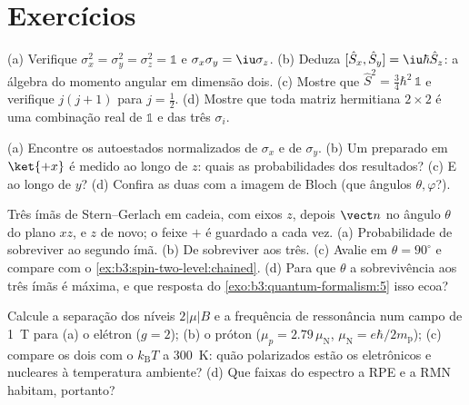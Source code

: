 \section{Exercícios}

\begin{exercise}[$\star$]\label{exo:b3:spin-two-level:1}
(a) Verifique $\sigma_x^2 = \sigma_y^2 = \sigma_z^2 = \mathbb 1$ e
$\sigma_x\sigma_y = \iu\sigma_z$. (b) Deduza $[\hat S_x, \hat S_y]
= \iu\hbar\hat S_z$: a álgebra do momento angular em dimensão dois.
(c) Mostre que $\hat S^2 = \tfrac34\hbar^2\,\mathbb 1$ e verifique
$j(j+1)$ para $j = \tfrac12$. (d) Mostre que toda matriz hermitiana
$2\times2$ é uma combinação real de $\mathbb 1$ e das três
$\sigma_i$.
\end{exercise}

\begin{exercise}[$\star$]\label{exo:b3:spin-two-level:2}
(a) Encontre os autoestados normalizados de $\sigma_x$ e de $\sigma_y$.
(b) Um  preparado em $\ket{+x}$ é medido ao longo de $z$: quais as
probabilidades dos resultados? (c) E ao longo de $y$? (d) Confira as
duas com a imagem de Bloch (que ângulos $\theta, \varphi$?).
\end{exercise}

\begin{exercise}[$\star$]\label{exo:b3:spin-two-level:3}
Três ímãs de Stern--Gerlach em cadeia, com eixos $z$, depois $\vect n$
no ângulo $\theta$ do plano $xz$, e $z$ de novo; o feixe $+$ é guardado
a cada vez. (a) Probabilidade de sobreviver ao segundo ímã. (b) De
sobreviver aos três. (c) Avalie em $\theta = 90^\circ$ e compare com o
\cref{ex:b3:spin-two-level:chained}. (d) Para que $\theta$ a
sobrevivência aos três ímãs é máxima, e que resposta do
\cref{exo:b3:quantum-formalism:5} isso ecoa?
\end{exercise}

\begin{exercise}[$\star$]\label{exo:b3:spin-two-level:4}
Calcule a separação dos níveis $2|\mu|B$ e a frequência de ressonância
num campo de \qty{1}{T} para (a) o elétron ($g = 2$); (b) o
próton ($\mu_p = 2.79\,\mu_{\text{N}}$, $\mu_{\text{N}} =
e\hbar/2m_{\text{p}}$); (c) compare os dois com o $k_{\text{B}}T$ a
\qty{300}{K}: quão polarizados estão os  eletrônicos e nucleares à
temperatura ambiente? (d) Que faixas do espectro a RPE e a RMN
habitam, portanto?
\end{exercise}

